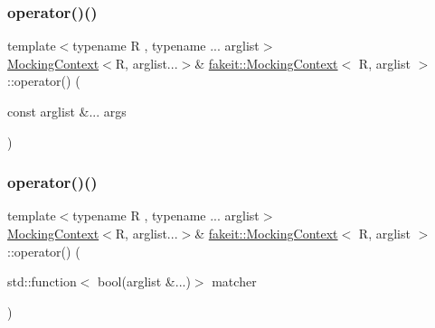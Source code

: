 \mbox{\label{classfakeit_1_1MockingContext_a70a55886680449fa36e8f5869af93389}} 
\subsubsection{\texorpdfstring{operator()()}{operator()()}\hspace{0.1cm}{\footnotesize\ttfamily [12/18]}}
{\footnotesize\ttfamily template$<$typename R , typename ... arglist$>$ \\
\mbox{\hyperlink{classfakeit_1_1MockingContext}{Mocking\+Context}}$<$R, arglist...$>$\& \mbox{\hyperlink{classfakeit_1_1MockingContext}{fakeit\+::\+Mocking\+Context}}$<$ R, arglist $>$\+::operator() (\begin{DoxyParamCaption}\item[{const arglist \&...}]{args }\end{DoxyParamCaption})\hspace{0.3cm}{\ttfamily [inline]}}

\mbox{\label{classfakeit_1_1MockingContext_aff3a6b6107f5bc4e028e75bf9b55f313}} 
\subsubsection{\texorpdfstring{operator()()}{operator()()}\hspace{0.1cm}{\footnotesize\ttfamily [13/18]}}
{\footnotesize\ttfamily template$<$typename R , typename ... arglist$>$ \\
\mbox{\hyperlink{classfakeit_1_1MockingContext}{Mocking\+Context}}$<$R, arglist...$>$\& \mbox{\hyperlink{classfakeit_1_1MockingContext}{fakeit\+::\+Mocking\+Context}}$<$ R, arglist $>$\+::operator() (\begin{DoxyParamCaption}\item[{std\+::function$<$ bool(arglist \&...)$>$}]{matcher }\end{DoxyParamCaption})\hspace{0.3cm}{\ttfamily [inline]}}

